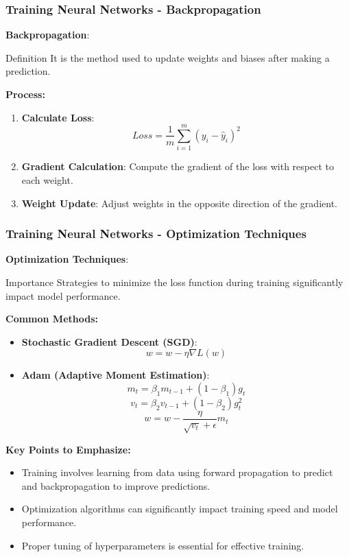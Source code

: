 \documentclass[aspectratio=169]{beamer}
\begin{document}
\begin{frame}[fragile]
  \frametitle{Training Neural Networks - Backpropagation}
  \textbf{Backpropagation}:
  
  \begin{block}{Definition}
      It is the method used to update weights and biases after making a prediction.
  \end{block}
  
  \textbf{Process:}
  \begin{enumerate}
      \item \textbf{Calculate Loss}:
          \[
          Loss = \frac{1}{m} \sum_{i=1}^{m} (y_i - \hat{y}_i)^2
          \]
      \item \textbf{Gradient Calculation}: Compute the gradient of the loss with respect to each weight.
      \item \textbf{Weight Update}: Adjust weights in the opposite direction of the gradient.
  \end{enumerate}
\end{frame}

\begin{frame}[fragile]
  \frametitle{Training Neural Networks - Optimization Techniques}
  \textbf{Optimization Techniques}:
  
  \begin{block}{Importance}
      Strategies to minimize the loss function during training significantly impact model performance.
  \end{block}
  
  \textbf{Common Methods:}
  \begin{itemize}
      \item \textbf{Stochastic Gradient Descent (SGD)}:
          \[
          w = w - \eta \nabla L(w)
          \]
      \item \textbf{Adam (Adaptive Moment Estimation)}:
          \[
          m_t = \beta_1 m_{t-1} + (1 - \beta_1) g_t
          \]
          \[
          v_t = \beta_2 v_{t-1} + (1 - \beta_2) g_t^2
          \]
          \[
          w = w - \frac{\eta}{\sqrt{v_t} + \epsilon} m_t
          \]
  \end{itemize}  

  \textbf{Key Points to Emphasize:}
  \begin{itemize}
      \item Training involves learning from data using forward propagation to predict and backpropagation to improve predictions.
      \item Optimization algorithms can significantly impact training speed and model performance.
      \item Proper tuning of hyperparameters is essential for effective training.
  \end{itemize}
\end{frame}
\end{document}
